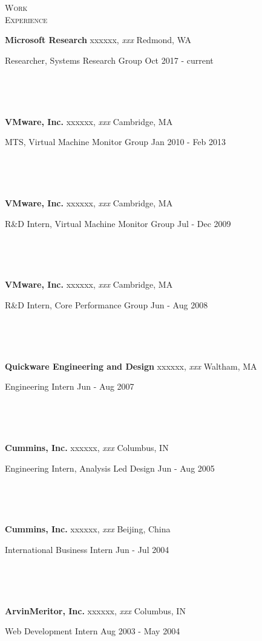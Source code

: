 \documentclass[10pt,times]{report}
\newlength{\sectiongap}
\newlength{\entrygap}
\newlength{\sectioncolwidth}
\newlength{\colgap}
\newlength{\stuffwidth}
\def\ifEqString#1#2{\def\testa{#1}\def\testb{#2}%
  \ifx\testa\testb}
\newenvironment{rtable}{
  \begin{minipage}{\textwidth}
  }{
  \end{minipage}
}
\newenvironment{rentry}[3][xxx]{
  \begin{minipage}[t]{\hsize}
    \textbf{#2}\ifEqString{#1}{xxx}\relax\else, \textit{#1}\fi
    \hspace{\stretch{1}} #3 \\
  }{
    \removelastskip
  \end{minipage}
  \\[\entrygap]  %
}
\newcommand{\rline}[2]{
  \begin{minipage}[t]{\hsize}
    #1 \hspace{\stretch{1}} #2
  \end{minipage} \\
}
\newenvironment{rsection}[1]{
  \begin{minipage}[t]{\sectioncolwidth}
    \textsc{#1}
  \end{minipage}
  \hspace{\colgap}
  \begin{minipage}[t]{\stuffwidth}
  }{
    \removelastskip
  \end{minipage}
  \\[\sectiongap]
}
\begin{document}
\begin{rtable}
  \begin{rsection}{Work\\Experience}
    \begin{rentry}{Microsoft Research}{Redmond, WA}
      \rline{Researcher, Systems Research Group} {Oct 2017 - current}
      \vspace{-.5em}
    \end{rentry}
    \begin{rentry}{VMware, Inc.}{Cambridge, MA}      
      \rline{MTS, Virtual Machine Monitor
        Group}{Jan 2010 - Feb 2013}
      \vspace{-.5em}
    \end{rentry}
    \begin{rentry}{VMware, Inc.}{Cambridge, MA}      
      \rline{R\&D Intern, Virtual Machine Monitor Group}{Jul - Dec 2009}
      \vspace{-.5em}
    \end{rentry}
    \begin{rentry}{VMware, Inc.}{Cambridge, MA}      
      \rline{R\&D Intern, Core Performance Group}{Jun - Aug 2008}
      \vspace{-.5em}
    \end{rentry}
    \begin{rentry}{Quickware Engineering and Design}{Waltham, MA}
      \rline{Engineering Intern}{Jun - Aug 2007} 
      \vspace{-.5em}
    \end{rentry}
    \begin{rentry}{Cummins, Inc.}{Columbus, IN}
      \rline{Engineering Intern, Analysis Led Design}{Jun - Aug 2005}
      \vspace{-.5em}
    \end{rentry}
    \begin{rentry}{Cummins, Inc.}{Beijing, China}
      \rline{International Business Intern}{Jun - Jul 2004} 
      \vspace{-.5em}
    \end{rentry}
    \begin{rentry}{ArvinMeritor, Inc.}{Columbus, IN}
      \rline{Web Development Intern}{Aug 2003 - May 2004}
      \vspace{-.5em}
    \end{rentry}
  \end{rsection}

    

\end{rtable}
\end{document}
